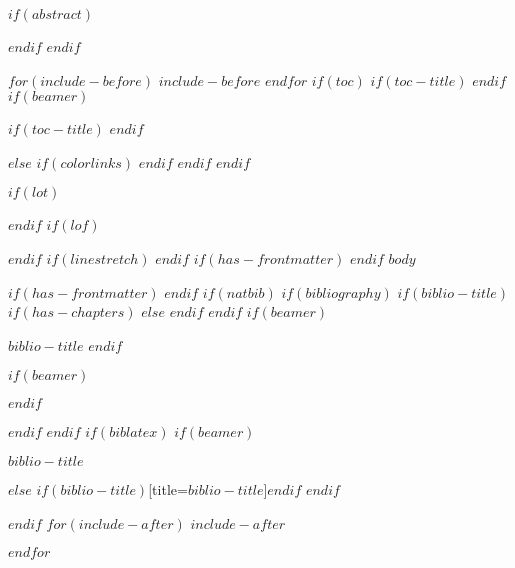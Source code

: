 \documentclass[twoside, %
$if(fontsize)$
  $fontsize$,
$endif$
$if(lang)$
  $babel-lang$,
$endif$
$if(papersize)$
  $papersize$paper,
$endif$
$if(beamer)$
  ignorenonframetext,
$if(handout)$
  handout,
$endif$
$if(aspectratio)$
  aspectratio=$aspectratio$,
$endif$
$endif$
$for(classoption)$
  $classoption$$sep$,
$endfor$
]{$documentclass$}
\newif\ifbibliography
\renewcommand*\contentsname{Inhoudsopgave}
\begin{document}
  \newpage
  \pagecolor{white}

  $if(abstract)$
  \begin{abstract}
  $abstract$
  \newpage
  \end{abstract}
  $endif$
$endif$


$for(include-before)$
$include-before$
$endfor$
$if(toc)$
$if(toc-title)$
$endif$
$if(beamer)$
\begin{frame}[allowframebreaks]
$if(toc-title)$
$endif$
\tableofcontents[hideallsubsections]
\end{frame}
$else$
{
$if(colorlinks)$
\hypersetup{linkcolor=$if(toccolor)$$toccolor$$else$$endif$}
$endif$
\setcounter{tocdepth}{$toc-depth$}
\tableofcontents
}
$endif$
$endif$

\newpage

$if(lot)$
\listoftables
\newpage
$endif$
$if(lof)$
\listoffigures
\newpage
$endif$
$if(linestretch)$
$endif$
$if(has-frontmatter)$
\mainmatter
$endif$
$body$

$if(has-frontmatter)$
\backmatter
$endif$
$if(natbib)$
$if(bibliography)$
$if(biblio-title)$
$if(has-chapters)$
\renewcommand\bibname{$biblio-title$}
$else$
\renewcommand\refname{$biblio-title$}
$endif$
$endif$
$if(beamer)$
\begin{frame}[allowframebreaks]{$biblio-title$}
  \bibliographytrue
$endif$
  
$if(beamer)$
\end{frame}
$endif$

$endif$
$endif$
$if(biblatex)$
$if(beamer)$
\begin{frame}[allowframebreaks]{$biblio-title$}
  \bibliographytrue
  \printbibliography[heading=none]
\end{frame}
$else$
\printbibliography$if(biblio-title)$[title=$biblio-title$]$endif$
$endif$

$endif$
$for(include-after)$
$include-after$

$endfor$
\end{document}
